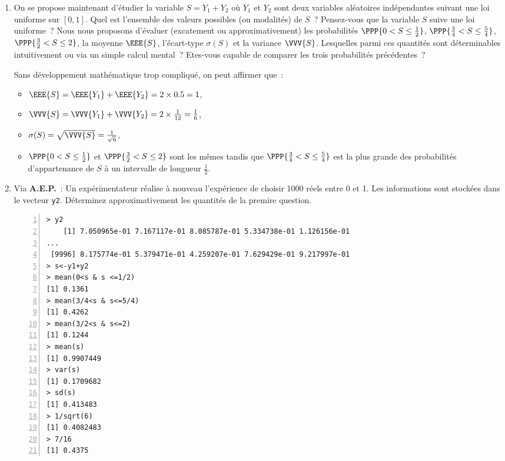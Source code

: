 \documentclass[10pt]{report}
\begin{document}
\begin{exercice}\label{ex:sommeUnifs}
\begin{enumerate}
\item On se propose maintenant d'étudier la variable $S=Y_1+Y_2$ où $Y_1$ et $Y_2$ sont deux variables aléatoires indépendantes suivant une loi uniforme sur $[0,1]$. Quel est l'ensemble des valeurs possibles (ou modalités) de $S$~? Pensez-vous que la variable $S$ suive une loi uniforme~?
Nous nous proposons d'évaluer (excatement ou approximativement) les probabilités $\PPP{0< S \leq \frac12}$, $\PPP{\frac34< S \leq \frac54}$, $\PPP{\frac32< S \leq 2}$, la moyenne $\EEE{S}$, l'écart-type $\sigma(S)$ et la variance $\VVV{S}$.  Lesquelles parmi ces quantités sont déterminables intuitivement ou via un simple calcul mental~? Etes-vous capable de comparer les trois probabilités précédentes~?

\begin{Correction} Sans développement mathématique trop compliqué, on peut affirmer que~:
\begin{itemize}
\item $\EEE{S}=\EEE{Y_1}+\EEE{Y_2}=2\times 0.5=1$, 
\item $\VVV{S}=\VVV{Y_1}+\VVV{Y_2}=2\times \frac1{12}=\frac16$,
\item $\sigma(S)=\sqrt{\VVV{S}}=\frac1{\sqrt{6}}$, 
\item $\PPP{0< S \leq \frac12}$ et $\PPP{\frac32< S \leq 2}$ sont les mêmes tandis que  $\PPP{\frac34< S \leq \frac54}$ est la plus grande des probabilités d'appartenance de $S$ à un intervalle de longueur $\frac12$.
\end{itemize} 
\end{Correction}


\item Via \textbf{A.E.P.}~: Un expérimentateur réalise à nouveau l'expérience de choisir 1000 réels entre 0 et 1. Les informations sont stockées dans le vecteur \texttt{y2}. Déterminez approximativement les quantités de la premire question.
\begin{Verbatim}[frame=leftline,fontfamily=tt,fontshape=n,numbers=left]
> y2
    [1] 7.050965e-01 7.167117e-01 8.085787e-01 5.334738e-01 1.126156e-01
...
 [9996] 8.175774e-01 5.379471e-01 4.259207e-01 7.629429e-01 9.217997e-01
> s<-y1+y2
> mean(0<s & s <=1/2)
[1] 0.1361
> mean(3/4<s & s<=5/4)
[1] 0.4262
> mean(3/2<s & s<=2)
[1] 0.1244
> mean(s)
[1] 0.9907449
> var(s)
[1] 0.1709682
> sd(s)
[1] 0.413483
> 1/sqrt(6)
[1] 0.4082483
> 7/16
[1] 0.4375
\end{Verbatim}



\end{enumerate}
\end{exercice}
\end{document}
